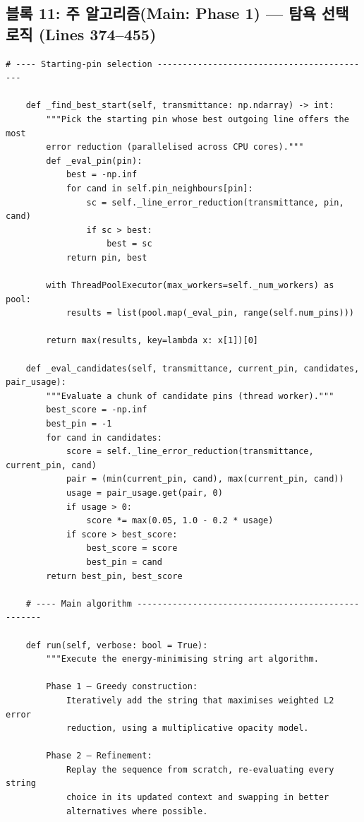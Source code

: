 \subsection*{블록 11: 주 알고리즘(Main: Phase 1) — 탐욕 선택 로직 (Lines 374--455)}
\begin{lstlisting}[firstnumber=374]
    # ---- Starting-pin selection -------------------------------------------

    def _find_best_start(self, transmittance: np.ndarray) -> int:
        """Pick the starting pin whose best outgoing line offers the most
        error reduction (parallelised across CPU cores)."""
        def _eval_pin(pin):
            best = -np.inf
            for cand in self.pin_neighbours[pin]:
                sc = self._line_error_reduction(transmittance, pin, cand)
                if sc > best:
                    best = sc
            return pin, best

        with ThreadPoolExecutor(max_workers=self._num_workers) as pool:
            results = list(pool.map(_eval_pin, range(self.num_pins)))

        return max(results, key=lambda x: x[1])[0]

    def _eval_candidates(self, transmittance, current_pin, candidates, pair_usage):
        """Evaluate a chunk of candidate pins (thread worker)."""
        best_score = -np.inf
        best_pin = -1
        for cand in candidates:
            score = self._line_error_reduction(transmittance, current_pin, cand)
            pair = (min(current_pin, cand), max(current_pin, cand))
            usage = pair_usage.get(pair, 0)
            if usage > 0:
                score *= max(0.05, 1.0 - 0.2 * usage)
            if score > best_score:
                best_score = score
                best_pin = cand
        return best_pin, best_score

    # ---- Main algorithm ---------------------------------------------------

    def run(self, verbose: bool = True):
        """Execute the energy-minimising string art algorithm.

        Phase 1 – Greedy construction:
            Iteratively add the string that maximises weighted L2 error
            reduction, using a multiplicative opacity model.

        Phase 2 – Refinement:
            Replay the sequence from scratch, re-evaluating every string
            choice in its updated context and swapping in better
            alternatives where possible.


\end{lstlisting}
